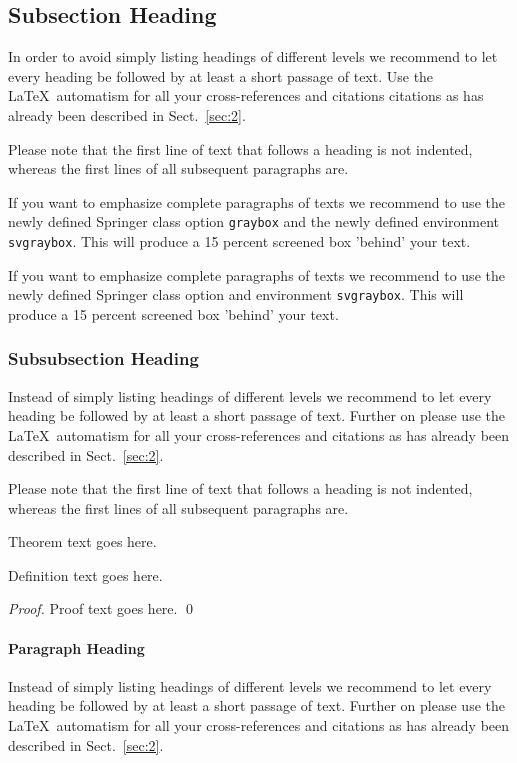 \documentclass[graybox]{svmult}
\begin{document}
\subsection{Subsection Heading} %
In order to avoid simply listing headings of different levels we recommend to let every heading be followed by at least a short passage of text. Use the \LaTeX\ automatism for all your cross-references and citations citations as has already been described in Sect.~\ref{sec:2}.

Please note that the first line of text that follows a heading is not indented, whereas the first lines of all subsequent paragraphs are.

\begin{svgraybox}
If you want to emphasize complete paragraphs of texts we recommend to use the newly defined Springer class option \verb|graybox| and the newly defined environment \verb|svgraybox|. This will produce a 15 percent screened box 'behind' your text.

If you want to emphasize complete paragraphs of texts we recommend to use the newly defined Springer class option and environment \verb|svgraybox|. This will produce a 15 percent screened box 'behind' your text.
\end{svgraybox}


\subsubsection{Subsubsection Heading}
Instead of simply listing headings of different levels we recommend to
let every heading be followed by at least a short passage of text.
Further on please use the \LaTeX\ automatism for all your
cross-references and citations as has already been described in
Sect.~\ref{sec:2}.

Please note that the first line of text that follows a heading is not indented, whereas the first lines of all subsequent paragraphs are.

\begin{theorem}
Theorem text goes here.
\end{theorem}
%
%
\begin{definition}
Definition text goes here.
\end{definition}

\begin{proof}
Proof text goes here.
\qed
\end{proof}

\paragraph{Paragraph Heading} %
Instead of simply listing headings of different levels we recommend to
let every heading be followed by at least a short passage of text.
Further on please use the \LaTeX\ automatism for all your
cross-references and citations as has already been described in
Sect.~\ref{sec:2}.
\end{document}
